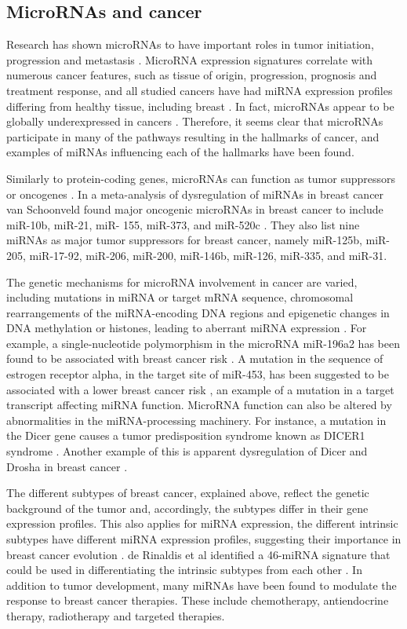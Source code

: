 \subsection{MicroRNAs and cancer}

Research has shown microRNAs to have important roles in tumor initiation,
progression and metastasis \citep{Lin2015}. MicroRNA expression signatures
correlate with numerous cancer features, such as tissue of origin, 
progression, prognosis and treatment response, and all studied cancers
have had miRNA expression profiles differing from healthy tissue, including breast
\citep{Calin2006}. In fact, microRNAs appear to be globally underexpressed in
cancers \citep{Lu2005}. Therefore, it seems clear that microRNAs participate
in many of the pathways resulting in the hallmarks of cancer, and
examples of miRNAs influencing each of the hallmarks have been found.

Similarly to protein-coding genes, microRNAs can function as tumor
suppressors or oncogenes \citep{Lin2015}. In a meta-analysis of dysregulation
of miRNAs in breast cancer van Schoonveld found major oncogenic microRNAs in
breast cancer to include miR-10b, miR-21, miR- 155, miR-373, and miR-520c
\citep{vanSchooneveld2015}. They also list nine miRNAs as major tumor suppressors for breast cancer,
namely miR-125b, miR-205, miR-17-92, miR-206, miR-200, miR-146b, miR-126,
miR-335, and miR-31.

The genetic mechanisms for microRNA involvement in cancer are varied,
including mutations in miRNA or target mRNA sequence, chromosomal
rearrangements of the miRNA-encoding DNA regions and epigenetic changes in DNA
methylation or histones, leading to aberrant miRNA expression
\citep{Calin2006,Melo2011}. For example, a single-nucleotide polymorphism
in the microRNA miR-196a2 has been found to be associated with breast cancer
risk \citep{Gao2011}. A mutation in the sequence of estrogen receptor alpha,
in the target site of miR-453, has been suggested to be associated with a
lower breast cancer risk \citep{Tchatchou2009}, an example of a mutation in
a target transcript affecting miRNA function. MicroRNA function can also be
altered by abnormalities in the miRNA-processing machinery. For instance, a
mutation in the Dicer gene causes a tumor predisposition syndrome known as
DICER1 syndrome \citep{Slade2011}. Another example of this is apparent
dysregulation of Dicer and Drosha in breast cancer \citep{Yan2012}.

The different subtypes of breast cancer, explained above, reflect the genetic
background of the tumor and, accordingly, the subtypes differ in their gene
expression profiles. This also applies for miRNA expression, the different
intrinsic subtypes have different miRNA expression profiles, suggesting their
importance in breast cancer evolution \citep{Blenkiron2007}. de Rinaldis et al
identified a 46-miRNA signature that could be used in differentiating the
intrinsic subtypes from each other \citep{deRinaldis2013}. In addition to
tumor development, many miRNAs have been found to modulate the response to
breast cancer therapies. These include chemotherapy, antiendocrine therapy,
radiotherapy and targeted therapies.

